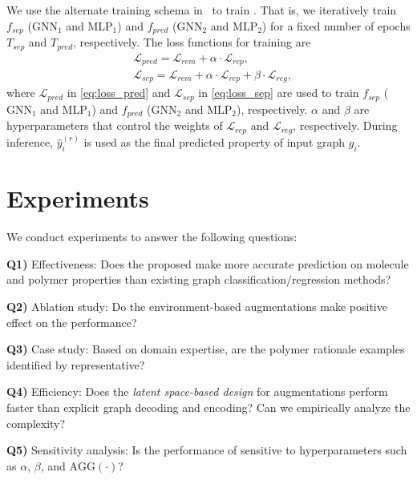\documentclass[sigconf]{acmart}
\begin{document}
We use the alternate training schema in~\citet{chang2020invariant} to train \method. That is, we iteratively train $f_{sep}$ ($\text{GNN}_1$ and $\text{MLP}_1$) and $f_{pred}$ ($\text{GNN}_2$ and $\text{MLP}_2$) for a fixed number of epochs $T_{sep}$ and $T_{pred}$, respectively.
The loss functions for training \method are
\begin{align}
    \label{eq:loss_pred}
    &\mathcal{L}_{pred} = \mathcal{L}_{{rem}} + \alpha \cdot \mathcal{L}_{{{rep}}}, \\
    \label{eq:loss_sep}
    &\mathcal{L}_{sep} = \mathcal{L}_{{rem}} + \alpha \cdot \mathcal{L}_{{{rep}}} + \beta \cdot  \mathcal{L}_{reg},
\end{align}
where $\mathcal{L}_{pred}$ in \cref{eq:loss_pred} and $\mathcal{L}_{sep}$ in \cref{eq:loss_sep} are used to train $f_{sep}$ ($\text{GNN}_1$ and $\text{MLP}_1$) and $f_{pred}$ ($\text{GNN}_2$ and $\text{MLP}_2$), respectively. $\alpha$ and $\beta$ are hyperparameters that control the weights of $\mathcal{L}_{rep}$ and $\mathcal{L}_{reg}$, respectively. During inference, $\hat{y}_{i}^{(r)}$ is used as the final predicted property of input graph $g_i$.
 
\section{Experiments}
\label{sec:experiments}
We conduct experiments to answer the following questions:
\begin{compactitem}
\item \textbf{Q1)} Effectiveness: Does the proposed \method make more accurate prediction on molecule and polymer properties than existing graph classification/regression methods?
\item \textbf{Q2)} Ablation study: Do the environment-based augmentations make positive effect on the performance?
\item \textbf{Q3)} Case study: Based on domain expertise, are the polymer rationale examples identified by \method representative? 
\item \textbf{Q4)} Efficiency: Does the \emph{latent space-based design} for augmentations perform faster than explicit graph decoding and encoding? Can we empirically analyze the complexity?
\item \textbf{Q5)} Sensitivity analysis: Is the performance of \method sensitive to hyperparameters such as $\alpha$, $\beta$, and $\text{AGG}(\cdot)$?
\end{compactitem}
\end{document}
